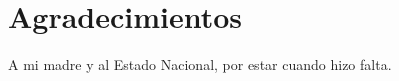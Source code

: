 \chapter*{Agradecimientos}

\noindent A mi madre y al Estado Nacional, por estar cuando hizo falta.
